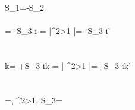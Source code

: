 \\
S_1=-S_2
\\\\
{\omega}= -S_3  i \omega = \left |\beta^2\textgreater 1 \right |=
-S_3 \frac {\beta}{\left | \beta \right |} \sqrt{} i\omega'
\\
\\
\\
{k}= +S_3  ik = \left | \beta^2\textgreater 1 \right |=+S_3 \frac {\beta}{\left | \beta \right |} \sqrt{} ik'
\\
\\
\\
\beta=, \beta^2\textgreater 1, S_3= 

